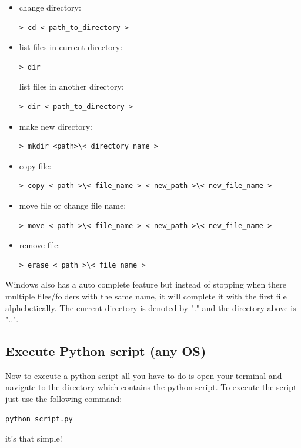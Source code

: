 \documentclass{SciPost}
\newcommand\0{\scalebox{-1}[1]{0}}
\let\svttfamily\ttfamily
\renewcommand\ttfamily{\svttfamily\catcode`0=\active }
\begin{document}
\begin{appendix}
\begin{itemize}
	\item change directory:
	\begin{lstlisting}[numbers=none,keywordstyle=\ttfamily]
	> cd < path_to_directory >
	\end{lstlisting}
	\item list files in current directory:
	\begin{lstlisting}[numbers=none,keywordstyle=\ttfamily]
	> dir
	\end{lstlisting}
	list files in another directory:
	\begin{lstlisting}[numbers=none,keywordstyle=\ttfamily]
	> dir < path_to_directory >
	\end{lstlisting}
	\item make new directory:
	\begin{lstlisting}[numbers=none,keywordstyle=\ttfamily]
	> mkdir <path>\< directory_name >
	\end{lstlisting}
	\item copy file:
	\begin{lstlisting}[numbers=none,keywordstyle=\ttfamily]
	> copy < path >\< file_name > < new_path >\< new_file_name >
	\end{lstlisting}
	\item move file or change file name:
	\begin{lstlisting}[numbers=none,keywordstyle=\ttfamily]
	> move < path >\< file_name > < new_path >\< new_file_name >
	\end{lstlisting}
	\item remove file:
	\begin{lstlisting}[numbers=none,keywordstyle=\ttfamily]
	> erase < path >\< file_name >
	\end{lstlisting}
	
\end{itemize}
Windows also has a auto complete feature but instead of stopping when there multiple files/folders with the same name, it will complete it with the first file alphebetically. The current directory is denoted by "." and the directory above is "..".

\subsection{Execute Python script (any OS)}
%
Now to execute a python script all you have to do is open your terminal and navigate to the directory which contains the python script. To execute the script just use the following command:
\begin{lstlisting}[numbers=none,keywordstyle=\ttfamily]
python script.py
\end{lstlisting}
it's that simple!


\end{appendix}
\end{document}
